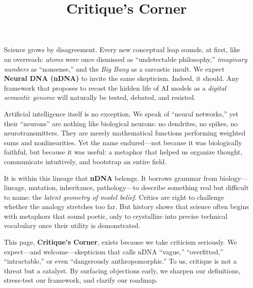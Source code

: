 \documentclass[11pt]{article}
\title{Critique’s Corner}
\begin{document}
\maketitle



% 



















Science grows by disagreement. Every new conceptual leap sounds, at first, like an overreach: 
\emph{atoms} were once dismissed as ``undetectable philosophy,'' 
\emph{imaginary numbers} as ``nonsense,'' 
and the \emph{Big Bang} as a sarcastic insult. 
We expect \textbf{Neural DNA (nDNA)} to invite the same skepticism. 
Indeed, it should. Any framework that proposes to recast the hidden life of AI models as a \emph{digital semantic genome} will naturally be tested, debated, and resisted. 

Artificial intelligence itself is no exception. We speak of ``neural networks,'' yet their ``neurons'' are nothing like biological neurons: no dendrites, no spikes, no neurotransmitters. 
They are merely mathematical functions performing weighted sums and nonlinearities. 
Yet the name endured—not because it was biologically faithful, but because it was useful: 
a metaphor that helped us organize thought, communicate intuitively, and bootstrap an entire field. 

It is within this lineage that \textbf{nDNA} belongs. 
It borrows grammar from biology---lineage, mutation, inheritance, pathology---to describe something real but difficult to name: the \emph{latent geometry of model belief}. 
Critics are right to challenge whether the analogy stretches too far. 
But history shows that science often begins with metaphors that sound poetic, only to crystallize into precise technical vocabulary once their utility is demonstrated. 

This page, \textbf{Critique's Corner}, exists because we take criticism seriously. 
We expect---and welcome---skepticism that calls nDNA ``vague,'' ``overfitted,'' ``intractable,'' or even ``dangerously anthropomorphic.'' 
To us, critique is not a threat but a catalyst. 
By surfacing objections early, we sharpen our definitions, stress-test our framework, and clarify our roadmap. 
\end{document}
